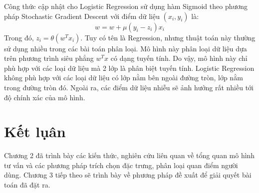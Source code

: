 Công thức cập nhật cho Logistic Regression sử dụng hàm Sigmoid theo phương pháp Stochastic 
Gradient Descent với điểm dữ liệu $(x_i , y_i)$ là:
\begin{equation}
    w = w +\mu(y_i-z_i)x_i
\end{equation}
Trong đó, $z_i=\theta(w^T x_i)$. Tuy có tên là Regression, nhưng thuật toán này thường sử dụng 
nhiều trong các bài toán phân loại. Mô hình này phân loại dữ liệu dựa trên phương trình siêu 
phẳng $w^T x$ có dạng tuyến tính. Do vậy, mô hình này chỉ phù hợp với các loại dữ liệu mà 2 lớp 
là phân biệt tuyến tính. Logistic Regression không phù hợp với các loại dữ liệu có lớp nằm bên
ngoài đường tròn, lớp nằm trong đường tròn đó. Ngoài ra, các điểm dữ liệu nhiễu sẽ ảnh
hưởng rất nhiều tới độ chính xác của mô hình.

\section{Kết lụân}
Chương 2 đã trình bày các kiến thức, nghiên cứu liên quan về tổng quan mô hình tư vấn và các 
phương pháp trích chọn đặc trưng, phân loại quan điểm người dùng. Chương 3 tiếp theo sẽ trình bày 
về phương pháp đề xuất để giải quyết bài toán đã đặt ra.

